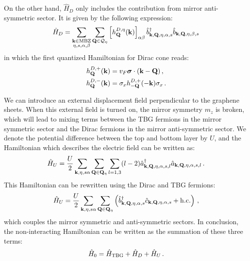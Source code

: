 \documentclass[prb,aps,nofootinbib,amssymb,twocolumn,superscriptaddress,10pt]{revtex4-2}
\begin{document}
On the other hand, $\hat{H}_D$ only includes the contribution from mirror anti-symmetric sector. It is given by the following expression:
\begin{equation}\label{eqn:ham_dirac}
	\hat{H}_D = \sum_{\substack{\mathbf{k}\in{\rm MBZ} \\ \eta, s, \alpha, \beta}}\sum_{\mathbf{Q}\in\mathcal{Q}_{\eta}}\left[h_{\mathbf{Q}}^{D,\eta}(\mathbf{k})\right]_{\alpha\beta}\hat{b}^\dagger_{\mathbf{k}, \mathbf{Q}, \eta, \alpha, s}\hat{b}_{\mathbf{k}, \mathbf{Q}, \eta, \beta, s}
\end{equation}
in which the first quantized Hamiltonian for Dirac cone reads:
\begin{align}
	h^{D,+}_\mathbf{Q}(\mathbf{k}) &= v_F\bm{\sigma}\cdot(\mathbf{k} - \mathbf{Q})\,,\\
	h^{D,-}_{\mathbf{Q}}(\mathbf{k}) &= \sigma_x h^{D,+}_{-\mathbf{Q}}(-\mathbf{k})\sigma_x\,.
\end{align}

We can introduce an external displacement field perpendicular to the graphene sheets. When this external field is turned on, the mirror symmetry $m_z$ is broken, which will lead to mixing terms between the TBG fermions in the mirror symmetric sector and the Dirac fermions in the mirror anti-symmetric sector. We denote the potential difference between the top and bottom layer by $U$, and the Hamiltonian which describes the electric field can be written as:
\begin{equation}
	\hat{H}_U = \frac{U}{2} \sum_{\mathbf{k},\eta,s\alpha}\sum_{\mathbf{Q}\in\mathbf{Q}_\eta}\sum_{l=1,3}(l-2)\hat{a}^\dagger_{\mathbf{k}, \mathbf{Q}, \eta, \alpha, s, l}\hat{a}_{\mathbf{k}, \mathbf{Q}, \eta, \alpha, s,l}\,.
\end{equation}
This Hamiltonian can be rewritten using the Dirac and TBG fermions:
\begin{equation}
	\hat{H}_U = \frac{U}{2}\sum_{\mathbf{k},\eta,s\alpha}\sum_{\mathbf{Q}\in\mathbf{Q}_\eta}\left(\hat{b}^\dagger_{\mathbf{k},\mathbf{Q},\eta, \alpha,s}\hat{c}_{\mathbf{k}, \mathbf{Q}, \eta, \alpha, s} + {\rm h.c.}\right)\,,\label{eq-HU-full}
\end{equation}
which couples the mirror symmetric and anti-symmetric sectors. In conclusion, the non-interacting Hamiltonian can be written as the summation of these three terms:
\begin{equation}\label{eqn:bm_hamiltonian}
	\hat{H}_0 = \hat{H}_{\rm TBG} + \hat{H}_D + \hat{H}_U\,.
\end{equation}
\end{document}
